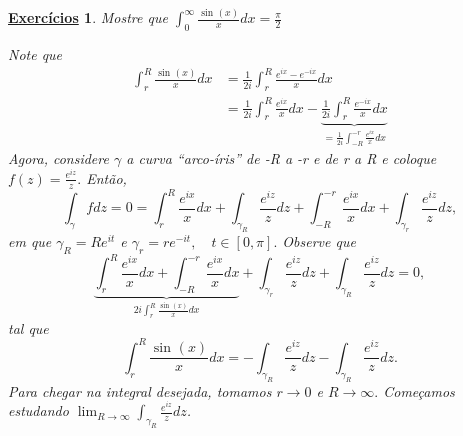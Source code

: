\documentclass{article}
\newtheorem*{exer*}{\underline{Exerc\'icios}}
\begin{document}
  \begin{exer*}
    Mostre que \(\int_{0}^{\infty}\frac{\sin^{}{(x)}}{x}dx = \frac{\pi }{2}\)

    Note que 
    \begin{align*}
      \int_{r}^{R}\frac{\sin^{}{(x)}}{x}dx &= \frac{1}{2i}\int_{r}^{R}\frac{e^{ix}-e^{-ix}}{x}dx\\ 
                                           &= \frac{1}{2i}\int_{r}^{R}\frac{e^{ix}}{x}dx - \underbrace{\frac{1}{2i}\int_{r}^{R}\frac{e^{-ix}}{x}dx}_{= \frac{1}{2i}\int_{-R}^{-r}\frac{e^{ix}}{x}dx}
    \end{align*}
    Agora, considere \(\gamma \) a curva ``arco-íris'' de -R a -r e de r a R e coloque \(f(z) = \frac{e^{iz}}{z}.\) Então,
    \[
      \int_{\gamma }^{}f dz = 0 = \int_{r}^{R}\frac{e^{ix}}{x}dx + \int_{\gamma_{R}}^{}\frac{e^{iz}}{z}dz + \int_{-R}^{-r}\frac{e^{ix}}{x}dx + \int_{\gamma_{r}}^{}\frac{e^{iz}}{z}dz,
    \]
    em que \(\gamma_{R} = Re^{it}\) e \(\gamma_{r} = r e^{-it},\quad t\in [0,\pi ].\) Observe que 
    \[
      \underbrace{\int_{r}^{R}\frac{e^{ix}}{x}dx + \int_{-R}^{-r}\frac{e^{ix}}{x}dx}_{2i \int_{r}^{R}\frac{\sin^{}{(x)}}{x}dx} + \int_{\gamma_{r}}^{}\frac{e^{iz}}{z}dz + \int_{\gamma_{R}}^{}\frac{e^{iz}}{z}dz = 0,
    \]
    tal que 
    \[
      \int_{r}^{R}\frac{\sin^{}{(x)}}{x}dx = - \int_{\gamma_{R}}^{}\frac{e^{iz}}{z}dz - \int_{\gamma_{R}}^{}\frac{e^{iz}}{z}dz.
    \]
    Para chegar na integral desejada, tomamos \(r\to 0 \) e \(R\to \infty.\) Começamos estudando \(\lim_{R\to \infty}\int_{\gamma_{R}}^{}\frac{e^{iz}}{z}dz\).


\end{exer*}
\end{document}
